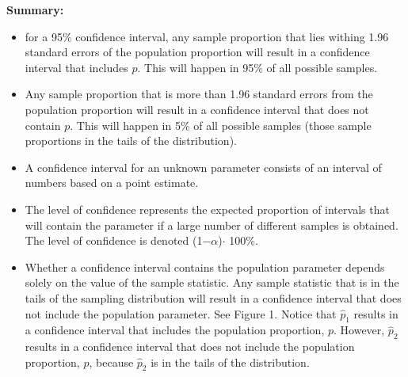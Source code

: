 \documentclass{report}
\begin{document}
    \pagebreak \bigbreak \noindent 
    \textbf{Summary:}
    \bigbreak \noindent 
    \begin{itemize}
        \item for a 95\% confidence interval, any sample proportion that lies withing 1.96 standard errors of the population proportion will result in a confidence interval that includes $p $. This will happen in 95\% of all possible samples.
        \item Any sample proportion that is more than 1.96 standard errors from the population proportion will result in a confidence interval that does not contain $p $. This will happen in 5\% of all possible samples (those sample proportions in the tails of the distribution).
        \item A confidence interval for an unknown parameter consists of an interval of numbers based on a point estimate.
        \item The level of confidence represents the expected proportion of intervals that will contain the parameter if a large number of different samples is obtained. The level of confidence is denoted (1−$\alpha $)$\cdot $ 100\%.
        \item Whether a confidence interval contains the population parameter depends solely on the value of the sample statistic. Any sample statistic that is in the tails of the sampling distribution will result in a confidence interval that does not include the population parameter. See Figure 1. Notice that $\hat{p}_1$ results in a confidence interval that includes the population proportion, $p$. However, $\hat{p}_2$ results in a confidence interval that does not include the population proportion, $p$, because $\hat{p}_2$ is in the tails of the distribution.
    \end{itemize}
\end{document}
